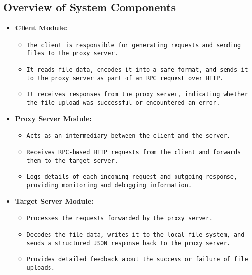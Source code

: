 \documentclass{article}
\begin{document}
\subsection{Overview of System Components}
\begin{itemize}
\RaggedRight
    \item \textbf{Client Module:}
    \begin{itemize}
        \item \texttt{The client is responsible for generating requests and sending files to the proxy server.}
        \item \texttt{It reads file data, encodes it into a safe format, and sends it to the proxy server as part of an RPC request over HTTP.}
        \item \texttt{It receives responses from the proxy server, indicating whether the file upload was successful or encountered an error.}
    \end{itemize}
    \item \textbf{Proxy Server Module:}
    \begin{itemize}
        \item \texttt{Acts as an intermediary between the client and the server.}
        \item \texttt{Receives RPC-based HTTP requests from the client and forwards them to the target server.}
        \item \texttt{Logs details of each incoming request and outgoing response, providing monitoring and debugging information.}
    \end{itemize}
    \item \textbf{Target Server Module:}
    \begin{itemize}
        \item \texttt{Processes the requests forwarded by the proxy server.}
        \item \texttt{Decodes the file data, writes it to the local file system, and sends a structured JSON response back to the proxy server.}
        \item \texttt{Provides detailed feedback about the success or failure of file uploads.}
    \end{itemize}
\end{itemize}
\end{document}
